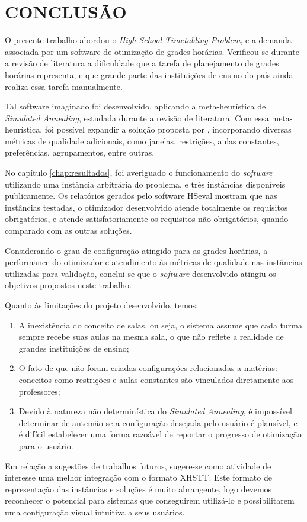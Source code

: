 
\chapter{CONCLUSÃO}
\label{chap:conclusao}

O presente trabalho abordou o \textit{High School Timetabling Problem}, e a demanda associada por um software de otimização de grades horárias. Verificou-se durante a revisão de literatura a dificuldade que a tarefa de planejamento de grades horárias representa, e que grande parte das instituições de ensino do país ainda realiza essa tarefa manualmente.

Tal software imaginado foi desenvolvido, aplicando a meta-heurística de \textit{Simulated Annealing}, estudada durante a revisão de literatura. Com essa meta-heurística, foi possível expandir a solução proposta por , incorporando diversas métricas de qualidade adicionais, como janelas, restrições, aulas constantes, preferências, agrupamentos, entre outras.

No capítulo \ref{chap:resultados}, foi averiguado o funcionamento do \textit{software} utilizando uma instância arbitrária do problema, e três instâncias disponíveis publicamente. Os relatórios gerados pelo software HSeval mostram que nas instâncias testadas, o otimizador desenvolvido atende totalmente os requisitos obrigatórios, e atende satisfatoriamente os requisitos não obrigatórios, quando comparado com as outras soluções.

Considerando o grau de configuração atingido para as grades horárias, a performance do otimizador e atendimento às métricas de qualidade nas instâncias utilizadas para validação, conclui-se que o \textit{software} desenvolvido atingiu os objetivos propostos neste trabalho.

Quanto às limitações do projeto desenvolvido, temos:
\begin{enumerate}
	\item A inexistência do conceito de salas, ou seja, o sistema assume que cada turma sempre recebe suas aulas na mesma sala, o que não reflete a realidade de grandes instituições de ensino;
	\item O fato de que não foram criadas configurações relacionadas a matérias: conceitos como restrições e aulas constantes são vinculados diretamente aos professores;
	\item Devido à natureza não determinística do \textit{Simulated Annealing}, é impossível determinar de antemão se a configuração desejada pelo usuário é plausível, e é difícil estabelecer uma forma razoável de reportar o progresso de otimização para o usuário.
\end{enumerate}

Em relação a sugestões de trabalhos futuros, sugere-se como atividade de interesse uma melhor integração com o formato XHSTT. Este formato de representação das instâncias e soluções é muito abrangente, logo devemos reconhecer o potencial para sistemas que conseguirem utilizá-lo e possibilitarem uma configuração visual intuitiva a seus usuários.
